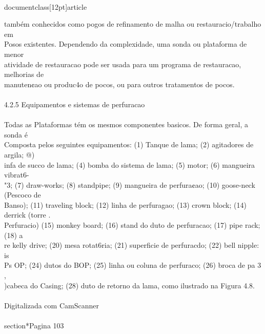 \\documentclass[12pt]{article}
\begin{document}
também conhecidos como pogos de refinamento de malha ou restauracio/trabalho em\\
Posos existentes. Dependendo da complexidade, uma sonda ou plataforma de menor\\
atividade de restauracao pode ser usada para um programa de restauracao, melhorias de\\
manuten¢ao ou produc4o de pocos, ou para outros tratamentos de pocos.\\
\\
4.2.5 Equipamentos e sistemas de perfuracao\\
\\
Todas as Plataformas tém os mesmos componentes basicos. De forma geral, a sonda é\\
Composta pelos seguintes equipamentos: (1) Tanque de lama; (2) agitadores de argila; @)\\
infa de succo de lama; (4) bomba do sistema de lama; (5) motor; (6) mangueira vibrat6-\\
"3; (7) draw-works; (8) standpipe; (9) mangueira de perfura¢ao; (10) goose-neck (Pescoco de\\
Banso); (11) traveling block; (12) linha de perfuragao; (13) crown block; (14) derrick (torre .\\
Perfuracio) (15) monkey board; (16) stand do duto de perfuracao; (17) pipe rack; (18) a\\
re kelly drive; (20) mesa rotat6ria; (21) superficie de perfuracdo; (22) bell nipple: is\\
Ps OP; (24) dutos do BOP; (25) linha ou coluna de perfuraco; (26) broca de pa 3 ,\\
)cabeca do Casing; (28) duto de retorno da lama, como ilustrado na Figura 4.8.\\
\\
Digitalizada com CamScanner\\

\\section*{Pagina 103}
\end{document}
